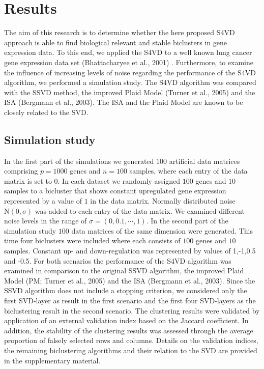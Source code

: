 \chapter{Results}
The aim of this research is to determine whether the here proposed S4VD approach is able to find biological relevant and stable biclusters in gene expression data. To this end, we applied the S4VD to a well known lung cancer gene expression data set (Bhattacharyee et al., 2001) \nocite{Bhattacharjee2001}. Furthermore, to examine the influence of increasing levels of noise regarding the performance of the S4VD algorithm, we performed a simulation study. The S4VD algorithm was compared with the SSVD method, the improved Plaid Model (Turner et al., 2005) and the ISA (Bergmann et al., 2003).  The ISA and the Plaid Model are known to be closely related to the SVD.  

\section{Simulation study}
In the first part of the simulations we generated $100$ artificial data matrices comprising $p=1000$ genes and $n=100$ samples, where each entry of the data matrix is set to $0$. In each dataset we randomly assigned $100$ genes and $10$ samples to a bicluster that shows constant upregulated gene expression represented by a value of $1$ in the data matrix. Normally distributed noise $\text{N}(0,\sigma)$ was added to each entry of the data matrix. We examined different noise levels in the range of $\sigma=(0,0.1,\cdots,1)$. In the second part of the simulation study $100$ data matrices of the same dimension were generated. This time four biclusters were included where each consists of $100$ genes and $10$ samples. Constant up- and down-regulation was represented by values of 1,-1,0.5 and -0.5. For both scenarios the performance of the S4VD algorithm was examined in comparison to the original SSVD algorithm, the improved Plaid Model (PM; Turner et al., 2005) and the ISA (Bergmann et al., 2003). Since the SSVD algorithm does not include a stopping criterion, we considered only the first SVD-layer as result in the first scenario and the first four SVD-layers as the biclustering result in the second scenario. The clustering results were validated by application of an external validation index based on the Jaccard coefficient. In addition, the stability of the clustering results was assessed through the average proportion of falsely selected rows and columns. Details on the validation indices, the remaining biclustering algorithms and their relation to the SVD are provided in the supplementary material. 
